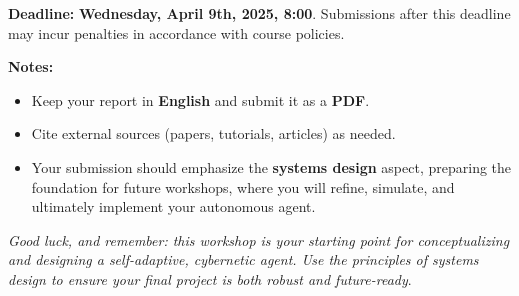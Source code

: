 \documentclass[doc]{apa6}
\begin{document}
\noindent \textbf{Deadline:} \textbf{Wednesday, April 9th, 2025, 8:00}. Submissions after 
this deadline may incur penalties in accordance with course policies.

\bigskip
\noindent \textbf{Notes:}
\begin{itemize}
    \item Keep your report in \textbf{English} and submit it as a \textbf{PDF}.
    \item Cite external sources (papers, tutorials, articles) as needed. 
    \item Your submission should emphasize the \textbf{systems design} aspect, 
        preparing the foundation for future workshops, where you will refine, simulate, 
        and ultimately implement your autonomous agent.
\end{itemize}

\noindent \textit{Good luck, and remember: this workshop is your starting point for 
        conceptualizing and designing a self-adaptive, cybernetic agent. Use the 
        principles of \textit{systems design} to ensure your final project is both 
        robust and future-ready}.
\end{document}
